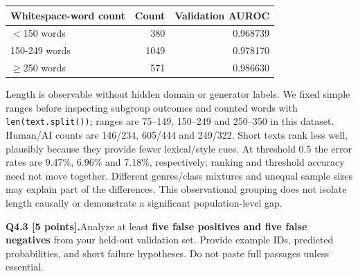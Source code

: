 \documentclass[11pt,letterpaper]{article}
\newcommand{\question}[2]{\needspace{4\baselineskip}\par\addvspace{0.45em}\noindent\textbf{#1}\quad #2\par\nobreak\vspace{0.1em}}
\begin{document}
\begin{tabularx}{\linewidth}{@{}Yrr@{}}\toprule Whitespace-word count & Count & Validation AUROC \\ \midrule
$<$150 words & 380 & 0.968739 \\
150-249 words & 1049 & 0.978170 \\
$\geq$250 words & 571 & 0.986630 \\
\bottomrule\end{tabularx}
Length is observable without hidden domain or generator labels. We fixed simple ranges before inspecting subgroup outcomes and counted words with \texttt{len(text.split())}; ranges are 75--149, 150--249 and 250--350 in this dataset. Human/AI counts are 146/234, 605/444 and 249/322. Short texts rank less well, plausibly because they provide fewer lexical/style cues. At threshold 0.5 the error rates are 9.47\%, 6.96\% and 7.18\%, respectively; ranking and threshold accuracy need not move together. Different genres/class mixtures and unequal sample sizes may explain part of the differences. This observational grouping does not isolate length causally or demonstrate a significant population-level gap.

\question{Q4.3 [5 points].}{Analyze at least \textbf{five false positives and five false negatives} from your held-out validation set. Provide example IDs, predicted probabilities, and short failure hypotheses. Do not paste full passages unless essential.}
\end{document}
